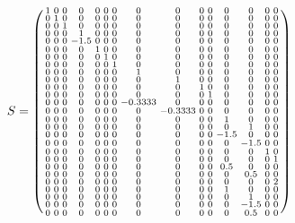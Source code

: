 \documentclass[fleqn]{article}
\begin{document}
\begin{equation}
S = \spmqty{ 1 & 0 & 0 & 0 & 0 & 0 & 0 & 0 & 0 & 0 & 0 & 0 & 0 & 0 & 0 \\ 0 & 1 & 0 & 0 & 0 & 0 & 0 & 0 & 0 & 0 & 0 & 0 & 0 & 0 & 0 \\ 0 & 0 & 1 & 0 & 0 & 0 & 0 & 0 & 0 & 0 & 0 & 0 & 0 & 0 & 0 \\ 0 & 0 & 0 & 1 & 0 & 0 & 0 & 0 & 0 & 0 & 0 & 0 & 0 & 0 & 0 \\ 0 & 0 & 0 & -1.5 & 0 & 0 & 0 & 0 & 0 & 0 & 0 & 0 & 0 & 0 & 0 \\ 0 & 0 & 0 & 0 & 1 & 0 & 0 & 0 & 0 & 0 & 0 & 0 & 0 & 0 & 0 \\ 0 & 0 & 0 & 0 & 0 & 1 & 0 & 0 & 0 & 0 & 0 & 0 & 0 & 0 & 0 \\ 0 & 0 & 0 & 0 & 0 & 0 & 1 & 0 & 0 & 0 & 0 & 0 & 0 & 0 & 0 \\ 0 & 0 & 0 & 0 & 0 & 0 & 0 & 1 & 0 & 0 & 0 & 0 & 0 & 0 & 0 \\ 0 & 0 & 0 & 0 & 0 & 0 & 0 & 0 & 1 & 0 & 0 & 0 & 0 & 0 & 0 \\ 0 & 0 & 0 & 0 & 0 & 0 & 0 & 0 & 0 & 1 & 0 & 0 & 0 & 0 & 0 \\ 0 & 0 & 0 & 0 & 0 & 0 & 0 & 0 & 0 & 0 & 1 & 0 & 0 & 0 & 0 \\ 0 & 0 & 0 & 0 & 0 & 0 & 0 & -0.3333 & 0 & 0 & 0 & 0 & 0 & 0 & 0 \\ 0 & 0 & 0 & 0 & 0 & 0 & 0 & 0 & -0.3333 & 0 & 0 & 0 & 0 & 0 & 0 \\ 0 & 0 & 0 & 0 & 0 & 0 & 0 & 0 & 0 & 0 & 0 & 1 & 0 & 0 & 0 \\ 0 & 0 & 0 & 0 & 0 & 0 & 0 & 0 & 0 & 0 & 0 & 0 & 1 & 0 & 0 \\ 0 & 0 & 0 & 0 & 0 & 0 & 0 & 0 & 0 & 0 & 0 & -1.5 & 0 & 0 & 0 \\ 0 & 0 & 0 & 0 & 0 & 0 & 0 & 0 & 0 & 0 & 0 & 0 & -1.5 & 0 & 0 \\ 0 & 0 & 0 & 0 & 0 & 0 & 0 & 0 & 0 & 0 & 0 & 0 & 0 & 1 & 0 \\ 0 & 0 & 0 & 0 & 0 & 0 & 0 & 0 & 0 & 0 & 0 & 0 & 0 & 0 & 1 \\ 0 & 0 & 0 & 0 & 0 & 0 & 0 & 0 & 0 & 0 & 0 & 0.5 & 0 & 0 & 0 \\ 0 & 0 & 0 & 0 & 0 & 0 & 0 & 0 & 0 & 0 & 0 & 0 & 0.5 & 0 & 0 \\ 0 & 0 & 0 & 0 & 0 & 0 & 0 & 0 & 0 & 0 & 0 & 0 & 0 & 0 & 2 \\ 0 & 0 & 0 & 0 & 0 & 0 & 0 & 0 & 0 & 0 & 0 & 1 & 0 & 0 & 0 \\ 0 & 0 & 0 & 0 & 0 & 0 & 0 & 0 & 0 & 0 & 0 & 0 & 1 & 0 & 0 \\ 0 & 0 & 0 & 0 & 0 & 0 & 0 & 0 & 0 & 0 & 0 & 0 & -1.5 & 0 & 0 \\ 0 & 0 & 0 & 0 & 0 & 0 & 0 & 0 & 0 & 0 & 0 & 0 & 0.5 & 0 & 0 }

\end{equation}
\end{document}
